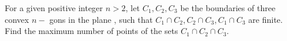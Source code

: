 For  a given positive integer $n >2$, let $C_{1},C_{2},C_{3}$ be the boundaries of three convex $n-$ gons in the plane , such that
$C_{1}\cap C_{2}, C_{2}\cap C_{3},C_{1}\cap C_{3}$ are finite. Find the maximum number of points of the sets $C_{1}\cap C_{2}\cap C_{3}$.